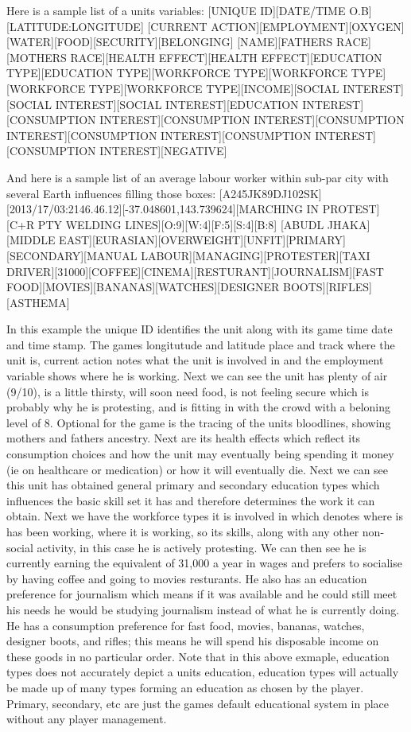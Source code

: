 Here is a sample list of a units variables:
[UNIQUE ID][DATE/TIME O.B][LATITUDE:LONGITUDE]
[CURRENT ACTION][EMPLOYMENT][OXYGEN][WATER][FOOD][SECURITY][BELONGING]
[NAME][FATHERS RACE][MOTHERS RACE][HEALTH EFFECT][HEALTH EFFECT][EDUCATION TYPE][EDUCATION TYPE][WORKFORCE TYPE][WORKFORCE TYPE]
[WORKFORCE TYPE][WORKFORCE TYPE][INCOME][SOCIAL INTEREST][SOCIAL INTEREST][SOCIAL INTEREST][EDUCATION INTEREST][CONSUMPTION INTEREST][CONSUMPTION INTEREST][CONSUMPTION INTEREST][CONSUMPTION INTEREST][CONSUMPTION INTEREST][CONSUMPTION INTEREST][NEGATIVE]

And here is a sample list of an average labour worker within sub-par city with several Earth influences filling those boxes:
[A245JK89DJ102SK][2013/17/03:2146.46.12][-37.048601,143.739624][MARCHING IN PROTEST][C+R PTY WELDING LINES][O:9][W:4][F:5][S:4][B:8]
[ABUDL JHAKA][MIDDLE EAST][EURASIAN][OVERWEIGHT][UNFIT][PRIMARY][SECONDARY][MANUAL LABOUR][MANAGING][PROTESTER][TAXI DRIVER][31000][COFFEE][CINEMA][RESTURANT][JOURNALISM][FAST FOOD][MOVIES][BANANAS][WATCHES][DESIGNER BOOTS][RIFLES][ASTHEMA]



In this example the unique ID identifies the unit along with its game time date and time stamp. The games longitutude and latitude place and track where the unit is, current action notes what the unit is involved in and the employment variable shows where he is working.
Next we can see the unit has plenty of air (9/10), is a little thirsty, will soon need food, is not feeling secure which is probably why he is protesting, and is fitting in with the crowd with a beloning level of 8. Optional for the game is the tracing of the units bloodlines, showing mothers and fathers ancestry. Next are its health effects which reflect its consumption choices and how the unit may eventually being spending it money (ie on healthcare or medication) or how it will eventually die. Next we can see this unit has obtained general primary and secondary education types which influences the basic skill set it has and therefore determines the work it can obtain. Next we have the workforce types it is involved in which denotes where is has been working, where it is working, so its skills, along with any other non-social activity, in this case he is actively protesting. We can then see he is currently earning the equivalent of 31,000 a year in wages and prefers to socialise by having coffee and going to movies resturants. He also has an education preference for journalism which means if it was available and he could still meet his needs he would be studying journalism instead of what he is currently doing. He has 
a consumption preference for fast food, movies, bananas, watches, designer boots, and rifles; this means he will spend his disposable income on these goods in no particular order. Note that in this above exmaple, education types does not accurately depict a units education, education types will actually be made up of many types forming an education as chosen by the player. Primary, secondary, etc are just the games default educational system in place without any player management.
	

